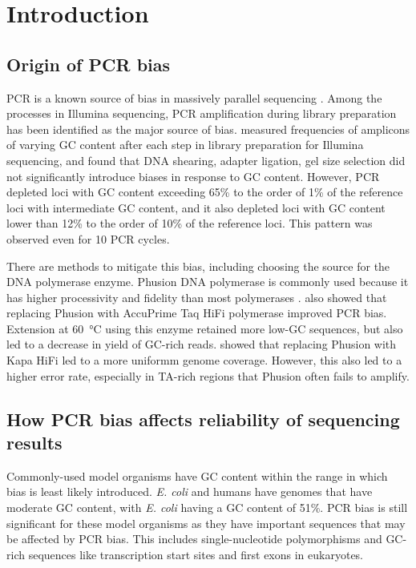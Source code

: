 \documentclass[parskip=full, numbers=noenddot]{scrbook}
\begin{document}
\section{Introduction}
\label{sec:pcrbias_intro}

\subsection{Origin of PCR bias}
\label{ssec:pcrbias_intro_origin}

PCR is a known source of bias in massively parallel sequencing \citep{olova_comparison_2018}.  Among the processes in Illumina sequencing, PCR amplification during library preparation has been identified as the major source of bias.  \citet{aird_analyzing_2011} measured frequencies of amplicons of varying GC content after each step in library preparation for Illumina sequencing, and found that DNA shearing, adapter ligation, gel size selection did not significantly introduce biases in response to GC content.  However, PCR depleted loci with GC content exceeding 65\% to the order of 1\% of the reference loci with intermediate GC content, and it also depleted loci with GC content lower than 12\% to the order of 10\% of the reference loci.  This pattern was observed even for 10 PCR cycles.

There are methods to mitigate this bias, including choosing the source for the DNA polymerase enzyme.  Phusion DNA polymerase is commonly used because it has higher processivity and fidelity than most polymerases \citep{quail_optimal_2012}.  \citet{aird_analyzing_2011} also showed that replacing Phusion with AccuPrime Taq HiFi polymerase improved PCR bias.  Extension at \SI{60}{\celsius} using this enzyme retained more low-GC sequences, but also led to a decrease in yield of GC-rich reads.  \citet{quail_optimal_2012} showed that replacing Phusion with Kapa HiFi led to a more uniformm genome coverage.  However, this also led to a higher error rate, especially in TA-rich regions that Phusion often fails to amplify.

\subsection{How PCR bias affects reliability of sequencing results}
\label{ssec:pcrbias_intro_effects}

Commonly-used model organisms have GC content within the range in which bias is least likely introduced.  \emph{E. coli} and humans have genomes that have moderate GC content, with \emph{E. coli} having a GC content of 51\%.  PCR bias is still significant for these model organisms as they have important sequences that may be affected by PCR bias.  This includes single-nucleotide polymorphisms and GC-rich sequences like transcription start sites and first exons in eukaryotes.  %
\end{document}
